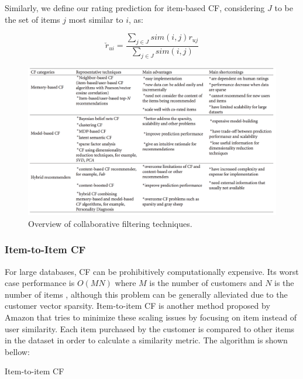 \documentclass[cic,tc,english]{iiufrgs}
\begin{document}
Similarly, we define our rating prediction for item-based CF, considering $J$ to be the set of items $j$ most similar to $i$, as:

$$
\check{r}_{ui} = \frac{\sum_{j \in J} sim(i, j)r_{uj}}{\sum_{j \in J} sim(i, j)}
$$

\begin{figure}
    \caption{Overview of collaborative filtering techniques.}
    \begin{center}
        \includegraphics[width=35em]{cf-comparison}
    \end{center}
    \label{fig:cf-comparison}
\end{figure}

\subsubsection{Item-to-Item CF}
For large databases, CF can be prohibitively computationally expensive. Its worst case performance is \(O(MN)\) where \(M\) is the number of customers and \(N\) is the number of items \cite{Linden2003}, although this problem can be generally alleviated due to the customer vector sparsity. Item-to-item CF is another method proposed by Amazon that tries to minimize these scaling issues by focusing on item instead of user similarity. Each item purchased by the customer is compared to other items in the dataset in order to calculate a similarity metric. The algorithm is shown bellow:

\begin{algorithm}[H]
 \caption{Item-to-item CF}
\end{algorithm}
\end{document}
